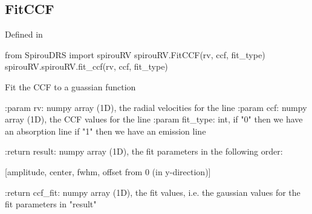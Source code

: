 \begin{minipage}{\textwidth}
\subsection{FitCCF}

Defined in \spirouRV{}

\begin{pythonbox}
from SpirouDRS import spirouRV
spirouRV.FitCCF(rv, ccf, fit_type)
spirouRV.spirouRV.fit_ccf(rv, ccf, fit_type)
\end{pythonbox}

\begin{pythondocstring}
Fit the CCF to a guassian function

:param rv: numpy array (1D), the radial velocities for the line
:param ccf: numpy array (1D), the CCF values for the line
:param fit_type: int, if "0" then we have an absorption line
                      if "1" then we have an emission line

:return result: numpy array (1D), the fit parameters in the
                following order:

            [amplitude, center, fwhm, offset from 0 (in y-direction)]

:return ccf_fit: numpy array (1D), the fit values, i.e. the gaussian values
                 for the fit parameters in "result"
\end{pythondocstring}
\end{minipage}

